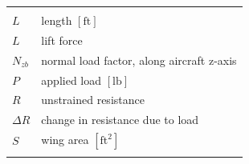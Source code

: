 \documentclass[
]{book}
\begin{document}
\begin{longtable}[]{@{}ll@{}}
\begin{minipage}[t]{0.80\columnwidth}
\end{minipage}\tabularnewline
\begin{minipage}[t]{0.14\columnwidth}\raggedright
\(L\)\strut
\end{minipage} & \begin{minipage}[t]{0.80\columnwidth}\raggedright
length \(\left[\text{ft}\right]\)\strut
\end{minipage}\tabularnewline
\begin{minipage}[t]{0.14\columnwidth}\raggedright
\(L\)\strut
\end{minipage} & \begin{minipage}[t]{0.80\columnwidth}\raggedright
lift force\strut
\end{minipage}\tabularnewline
\begin{minipage}[t]{0.14\columnwidth}\raggedright
\(N_{zb}\)\strut
\end{minipage} & \begin{minipage}[t]{0.80\columnwidth}\raggedright
normal load factor, along aircraft z-axis\strut
\end{minipage}\tabularnewline
\begin{minipage}[t]{0.14\columnwidth}\raggedright
\(P\)\strut
\end{minipage} & \begin{minipage}[t]{0.80\columnwidth}\raggedright
applied load \(\left[\text{lb}\right]\)\strut
\end{minipage}\tabularnewline
\begin{minipage}[t]{0.14\columnwidth}\raggedright
\(R\)\strut
\end{minipage} & \begin{minipage}[t]{0.80\columnwidth}\raggedright
unstrained resistance\strut
\end{minipage}\tabularnewline
\begin{minipage}[t]{0.14\columnwidth}\raggedright
\(\Delta R\)\strut
\end{minipage} & \begin{minipage}[t]{0.80\columnwidth}\raggedright
change in resistance due to load\strut
\end{minipage}\tabularnewline
\begin{minipage}[t]{0.14\columnwidth}\raggedright
\(S\)\strut
\end{minipage} & \begin{minipage}[t]{0.80\columnwidth}\raggedright
wing area \(\left[\text{ft}^2\right]\)\strut
\end{minipage}\tabularnewline
\begin{minipage}[t]{0.14\columnwidth}\raggedright

\end{minipage}
\end{longtable}
\end{document}
